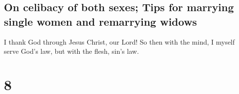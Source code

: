 \hypertarget{on-celibacy-of-both-sexes-tips-for-marrying-single-women-and-remarrying-widows}{%
\subsection{On celibacy of both sexes; Tips for marrying single women
and remarrying
widows}\label{on-celibacy-of-both-sexes-tips-for-marrying-single-women-and-remarrying-widows}}

 I thank God through Jesus Christ, our Lord! So then with
the mind, I myself serve God's law, but with the flesh, sin's law.

\hypertarget{section-7}{%
\section{8}\label{section-7}}

